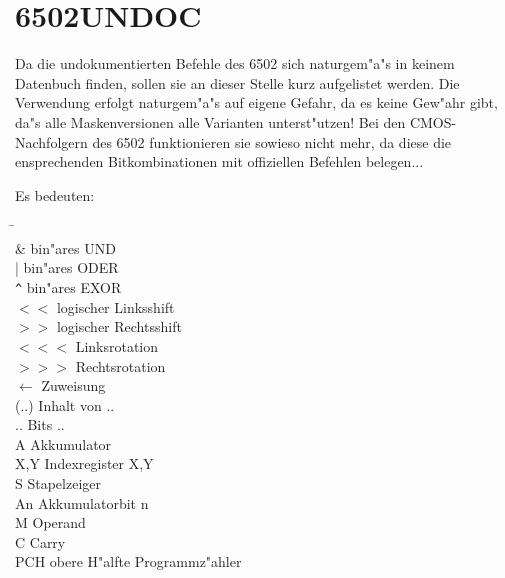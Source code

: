 \documentclass[12pt,a4paper,twoside]{report}
\begin{document}

\section{6502UNDOC}

Da die undokumentierten Befehle des 6502 sich naturgem"a"s in keinem
Datenbuch finden, sollen sie an dieser Stelle kurz aufgelistet werden.
Die Verwendung erfolgt naturgem"a"s auf eigene Gefahr, da es keine
Gew"ahr gibt, da"s alle Maskenversionen alle Varianten unterst"utzen!
Bei den CMOS-Nachfolgern des 6502 funktionieren sie sowieso nicht
mehr, da diese die ensprechenden Bitkombinationen mit offiziellen Befehlen
belegen...

\clearpage

Es bedeuten:

\begin{tabbing}
\hspace{2cm} \= \kill \\
\&             \> bin"ares UND \\
|              \> bin"ares ODER \\
\verb!^!       \> bin"ares EXOR \\
$<<$           \> logischer Linksshift \\
$>>$           \> logischer Rechtsshift \\
$<<<$          \> Linksrotation \\
$>>>$          \> Rechtsrotation \\
$\leftarrow$   \> Zuweisung \\
(..)           \> Inhalt von .. \\
{..}           \> Bits .. \\
A              \> Akkumulator \\
X,Y            \> Indexregister X,Y \\
S              \> Stapelzeiger \\
An             \> Akkumulatorbit n \\
M              \> Operand \\
C              \> Carry \\
PCH            \> obere H"alfte Programmz"ahler \\
\end{tabbing}
\end{document}
